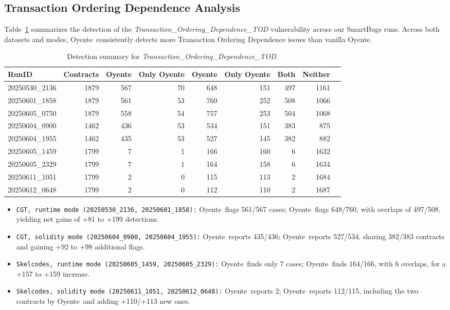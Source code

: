 \documentclass{article}
\newcommand\OY{Oyente}
\newcommand\OYp{\OY\raisebox{0.3ex}{\smaller +}}
\newcommand\CGTrbcA{20250530\_2136}%
\newcommand\CGTrbcB{20250601\_1858}%
\newcommand\CGTrbcC{20250605\_0750}%
\newcommand\CGTsscA{20250604\_0900}%
\newcommand\CGTsscB{20250604\_1955}%
\newcommand\SKCrbcA{20250605\_1459}%
\newcommand\SKCrbcB{20250605\_2329}%
\newcommand\SKCsscA{20250611\_1051}%
\newcommand\SKCsscB{20250612\_0648}%
\begin{document}
	\subsection{Transaction Ordering Dependence Analysis}
	Table~\ref{tab:tod-results} summarizes the detection of the \emph{Transaction\_Ordering\_Dependence\_TOD} vulnerability across our SmartBugs runs. Across both datasets and modes, \OYp\ consistently detects more Transaction Ordering Dependence issues than vanilla \OY.

	\begin{table}[ht]
		\centering
		\begin{tabular}{lrrrrrrrr}
			\toprule
			\textbf{RunID} & \textbf{Contracts} & \textbf{\OY} & \textbf{Only \OY} & \textbf{\OYp} & \textbf{Only \OYp} & \textbf{Both} & \textbf{Neither} \\
			\midrule
			\CGTrbcA & 1879 & 567 & 70 & 648 & 151 & 497 & 1161 \\
			\CGTrbcB & 1879 & 561 & 53 & 760 & 252 &  508 & 1066 \\
			\CGTrbcC & 1879 & 558 & 54 & 757 & 253 & 504 & 1068 \\
			\CGTsscA & 1462 & 436 & 53 & 534 & 151 & 383 & 875 \\
			\CGTsscB & 1462 & 435 & 53 & 527 & 145 & 382 & 882 \\
			\SKCrbcA & 1799 & 7 & 1 & 166 & 160 & 6 & 1632 \\
			\SKCrbcB & 1799 & 7 & 1 & 164 & 158 & 6 & 1634 \\
			\SKCsscA & 1799 & 2 & 0 & 115 & 113 & 2 & 1684 \\
			\SKCsscB & 1799 & 2 & 0 & 112 & 110 & 2 & 1687 \\
			\bottomrule
		\end{tabular}
		\caption{Detection summary for \emph{Transaction\_Ordering\_Dependence\_TOD}.}
		\label{tab:tod-results}
	\end{table}

	\begin{itemize}
		\item \texttt{CGT, runtime mode (\CGTrbcA, \CGTrbcB):}
		\OY\ flags 561/567 cases; \OYp\ flags 648/760, with overlaps of 497/508, yielding net gains of +81 to +199 detections.
		\item \texttt{CGT, solidity mode (\CGTsscA, \CGTsscB):}
		\OY\ reports 435/436; \OYp\ reports 527/534, sharing 382/383 contracts and gaining +92 to +98 additional flags.
		\item \texttt{Skelcodes, runtime mode (\SKCrbcA, \SKCrbcB):}
		\OY\ finds only 7 cases; \OYp\ finds 164/166, with 6 overlaps, for a +157 to +159 increase.
		\item \texttt{Skelcodes, solidity mode (\SKCsscA, \SKCsscB):}
		\OY\ reports 2; \OYp\ reports 112/115, including the two contracts by \OY\ and adding +110/+113 new ones.
	\end{itemize}
\end{document}

